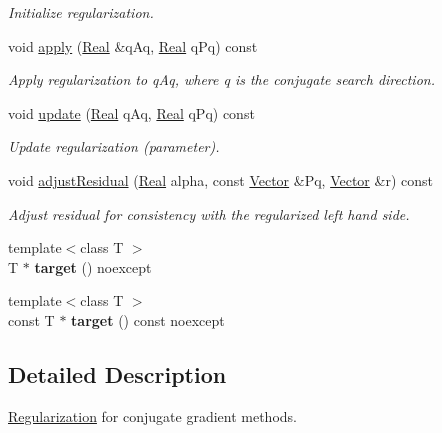 \begin{DoxyCompactItemize}
\begin{DoxyCompactList}\small\item\em Initialize regularization. \end{DoxyCompactList}\item 
void \hyperlink{classSpacy_1_1CG_1_1Regularization_ab55da1e68e5f25b89aa3713b95d254bd}{apply} (\hyperlink{classSpacy_1_1Real}{Real} \&q\-Aq, \hyperlink{classSpacy_1_1Real}{Real} q\-Pq) const 
\begin{DoxyCompactList}\small\item\em Apply regularization to q\-Aq, where q is the conjugate search direction. \end{DoxyCompactList}\item 
void \hyperlink{classSpacy_1_1CG_1_1Regularization_aa613081282b9d2d793331b4cdc299747}{update} (\hyperlink{classSpacy_1_1Real}{Real} q\-Aq, \hyperlink{classSpacy_1_1Real}{Real} q\-Pq) const 
\begin{DoxyCompactList}\small\item\em Update regularization (parameter). \end{DoxyCompactList}\item 
void \hyperlink{classSpacy_1_1CG_1_1Regularization_a1e7aef0bb066f3e07022141de223b606}{adjust\-Residual} (\hyperlink{classSpacy_1_1Real}{Real} alpha, const \hyperlink{classSpacy_1_1Vector}{Vector} \&Pq, \hyperlink{classSpacy_1_1Vector}{Vector} \&r) const 
\begin{DoxyCompactList}\small\item\em Adjust residual for consistency with the regularized left hand side. \end{DoxyCompactList}\item 
\hypertarget{classSpacy_1_1CG_1_1Regularization_aa1cf9cd090c192b0cd4707f986847f93}{{\footnotesize template$<$class T $>$ }\\T $\ast$ {\bfseries target} () noexcept}\label{classSpacy_1_1CG_1_1Regularization_aa1cf9cd090c192b0cd4707f986847f93}

\item 
\hypertarget{classSpacy_1_1CG_1_1Regularization_a131db28e9b9dad012b99860582c5bbf0}{{\footnotesize template$<$class T $>$ }\\const T $\ast$ {\bfseries target} () const noexcept}\label{classSpacy_1_1CG_1_1Regularization_a131db28e9b9dad012b99860582c5bbf0}

\end{DoxyCompactItemize}


\subsection{Detailed Description}
\hyperlink{classSpacy_1_1CG_1_1Regularization}{Regularization} for conjugate gradient methods. 

